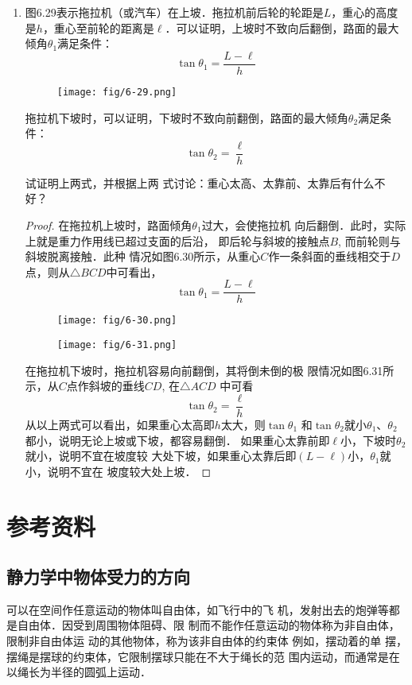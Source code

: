 \begin{enumerate}
\item  图6.29表示拖拉机（或汽车）在上坡．拖拉机前后轮的轮距是$L$，重心的高度是$h$，重心至前轮的距离是$\ell$．可以证明，上坡时不致向后翻倒，路面的最大倾角$\theta_1$满足条件：
\[\tan\theta_1=\frac{L-\ell}{h}\]
\begin{figure}[htp]
\centering\texttt{[image: fig/6-29.png]}
\caption{}
\end{figure}
拖拉机下坡时，可以证明，下坡时不致向前翻倒，路面的最大倾角$\theta_2$满足条件：
\[\tan\theta_2=\frac{\ell}{h}\]

试证明上两式，并根据上两
式讨论：重心太高、太靠前、太靠后有什么不好？

\begin{proof}
    在拖拉机上坡时，路面倾角$\theta_1$过大，会使拖拉机
    向后翻倒．此时，实际上就是重力作用线已超过支面的后沿，
    即后轮与斜坡的接触点$B$, 而前轮则与斜坡脱离接触．此种
    情况如图6.30所示，从重心$C$作一条斜面的垂线相交于$D$
    点，则从$\triangle BCD$中可看出，
\[\tan\theta_1=\frac{L-\ell}{h}\]
\begin{figure}[htp]\centering
    \begin{minipage}[t]{0.48\textwidth}
    \centering
\texttt{[image: fig/6-30.png]}
    \caption{}
    \end{minipage}
    \begin{minipage}[t]{0.48\textwidth}
    \centering
\texttt{[image: fig/6-31.png]}
    \caption{}
    \end{minipage}
    \end{figure}

    在拖拉机下坡时，拖拉机容易向前翻倒，其将倒未倒的极
    限情况如图6.31所示，从$C$点作斜坡的垂线$CD$, 在$\triangle ACD$
    中可看
\[\tan\theta_2=\frac{\ell }{h}\]
从以上两式可以看出，如果重心太高即$h$太大，则$\tan\theta_1$
和$\tan\theta_2$就小$\theta_1$、$\theta_2$都小，说明无论上坡或下坡，都容易翻倒．
如果重心太靠前即$\ell$小，下坡时$\theta_2$就小，说明不宜在坡度较
大处下坡，如果重心太靠后即$(L-\ell)$小，$\theta_1$就小，说明不宜在
坡度较大处上坡．
\end{proof}
\end{enumerate}



\section{参考资料}
\subsection{静力学中物体受力的方向}
可以在空间作任意运动的物体叫自由体，如飞行中的飞
机，发射出去的炮弹等都是自由体．因受到周围物体阻碍、限
制而不能作任意运动的物体称为非自由体，限制非自由体运
动的其他物体，称为该非自由体的约束体 例如，摆动着的单
摆，摆绳是摆球的约束体，它限制摆球只能在不大于绳长的范
围内运动，而通常是在以绳长为半径的圆弧上运动．

